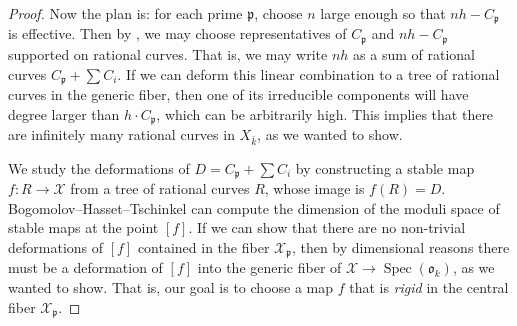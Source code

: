 \documentclass{amsart}
\renewcommand{\prime}{\mathfrak{p}}
\theoremstyle{plain}
\theoremstyle{definition}
\theoremstyle{remark}
\DeclareMathOperator{\Spec}{Spec}
\begin{document}
\begin{proof}
Now the plan is: for each prime $\prime$, choose $n$ large enough so that $nh-C_{\prime}$ is effective.
Then by , we may choose representatives of $C_{\prime}$ and $nh-C_{\prime}$
supported on rational curves. That is, we may write $nh$ as a sum of rational curves $C_{\prime}+\sum C_i$.
If we can deform this linear combination to a tree of rational curves in the generic fiber, then one of its
irreducible components will have degree larger than $h \cdot C_{\prime}$, which can be arbitrarily high. This implies that there are infinitely many rational curves in $X_{\bar{k}}$, as we wanted to show.

We study the deformations of $D=C_{\prime}+\sum C_i$ by constructing a stable map $f: R \to \mathcal{X}$ from
a tree of rational curves $R$,
whose image is $f(R)=D$.
Bogomolov--Hasset--Tschinkel can compute the dimension of the moduli space of stable maps
at the point $[f]$. If we can show that there are no non-trivial 
deformations of $[f]$ contained in the fiber $\mathcal{X}_{\prime}$, then by dimensional reasons there must
be a deformation of $[f]$ into the generic fiber of $\mathcal{X} \to \Spec(\mathfrak{o}_k)$, as we wanted to show. 
That is, our goal is to choose a map $f$ that is \emph{rigid} in the central fiber $\mathcal{X}_{\prime}$.


\end{proof}
\end{document}
